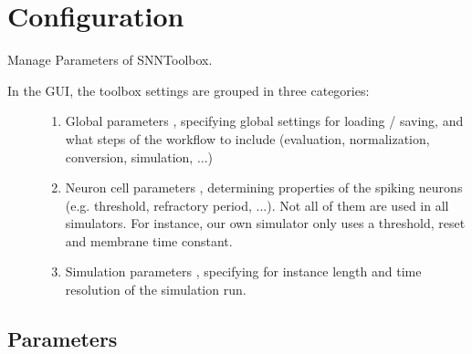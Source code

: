 \documentclass[letterpaper,10pt,english]{sphinxmanual}
\begin{document}
\section{Configuration}
\label{configure_toolbox:module-snntoolbox.config}\label{configure_toolbox::doc}\label{configure_toolbox:configuration}
Manage Parameters of SNNToolbox.
\begin{description}
\item[{In the GUI, the toolbox settings are grouped in three categories:}] \leavevmode\begin{enumerate}
\item {} 
Global parameters , specifying global settings for
loading / saving, and what steps of the workflow to include (evaluation,
normalization, conversion, simulation, ...)

\item {} 
Neuron cell parameters , determining properties of the
spiking neurons (e.g. threshold, refractory period, ...). Not all of
them are used in all simulators. For instance, our own simulator
 only uses a threshold, reset and membrane time constant.

\item {} 
Simulation parameters , specifying for instance length and
time resolution of the simulation run.

\end{enumerate}

\end{description}


\subsection{Parameters}
\label{configure_toolbox:parameters}
\end{document}
